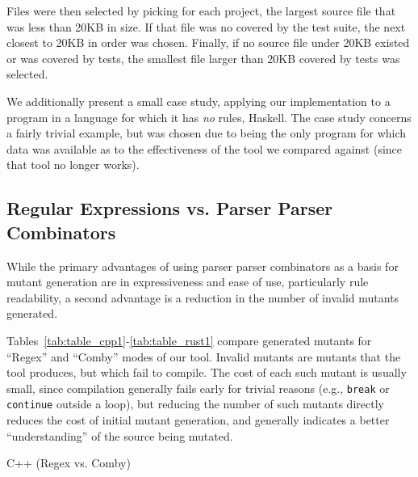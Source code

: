 \documentclass[sigconf,review, anonymous]{acmart}
\begin{document}
{      Files were then selected by picking for each project, the
      largest source file that was less than 20KB in size.  If that
      file was no covered by the test suite, the next closest to 20KB in order
      was chosen.  Finally, if no source file under 20KB existed or
      was covered by tests, the smallest file larger than 20KB covered
      by tests was selected.


We additionally present a small
case study, applying our implementation to a program in a language for
which it has \emph{no} rules, Haskell.  The case study concerns a
fairly trivial example, but was chosen due to being the only program
for which data was available as to the effectiveness of the tool we
compared against (since that tool no longer works).

\subsection{Regular Expressions vs. Parser Parser Combinators}

While the primary advantages of using parser parser combinators as a
basis for mutant generation are in expressiveness and ease of use,
particularly rule readability, a second advantage is a reduction in
the number of invalid mutants generated.

Tables~\ref{tab:table_cpp1}-\ref{tab:table_rust1} compare generated
mutants for ``Regex'' and ``Comby'' modes of our tool.  Invalid
mutants are mutants that the tool produces, but which fail to
compile.  The cost of each such mutant is usually small,
since compilation generally fails early for trivial reasons (e.g.,
{\tt break} or {\tt continue} outside a loop), 
but reducing the number of such mutants directly reduces the cost of
initial mutant generation, and generally indicates a better
``understanding'' of the source being mutated.

\begin{table}[hbtp]
\centering
\caption{C++ (Regex vs. Comby)}
\label{tab:table_cpp1}
\resizebox{\columnwidth}{!}{%

}
\end{table}}
\end{document}
